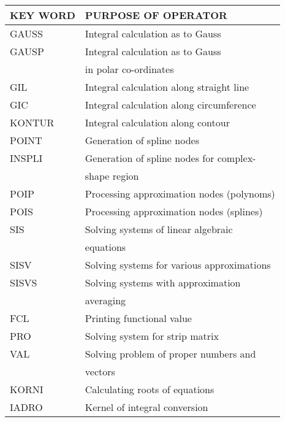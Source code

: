 {\begin{table}
  \begin{center}
  \begin{tabular}{|l|l|} \hline
   { KEY WORD} &  { PURPOSE OF OPERATOR} \\ \hline
     GAUSS     &    Integral calculation as to Gauss          \\
     GAUSP     &    Integral calculation as to Gauss          \\
               &    in polar co-ordinates                     \\
     GIL       &    Integral calculation along straight line  \\
     GIC       &    Integral calculation along circumference  \\
     KONTUR    &    Integral calculation along contour        \\ \hline
     POINT     &    Generation of spline nodes                \\
     INSPLI    &    Generation of spline nodes for complex-   \\
               &    shape region                              \\
     POIP      &    Processing approximation nodes (polynoms) \\
     POIS      &    Processing approximation nodes (splines)  \\ \hline
     SIS       &    Solving systems of linear algebraic       \\
               &    equations                                 \\
     SISV      &    Solving systems for various approximations \\
     SISVS     &    Solving systems with approximation         \\
               &    averaging                                  \\
     FCL       &    Printing functional value                  \\
     PRO       &    Solving system for strip matrix            \\
     VAL       &    Solving problem of proper numbers and      \\
               &    vectors                                    \\ \hline
     KORNI     &    Calculating roots of equations            \\
     IADRO     &    Kernel of integral conversion             \\ \hline

\end{tabular}
\end{center}
\end{table}}
